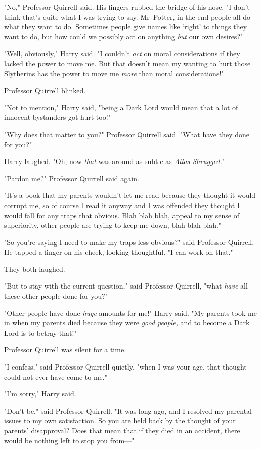 "No," Professor Quirrell said. His fingers rubbed the bridge of his nose. "I
don't think that's quite what I was trying to say. Mr~Potter, in the end
people all do what they want to do. Sometimes people give names like `right' to
things they want to do, but how could we possibly act on anything \emph{but}
our own desires?"

"Well, obviously," Harry said. "I couldn't \emph{act} on moral considerations
if they lacked the power to move me. But that doesn't mean my wanting to hurt
those Slytherins has the power to move me \emph{more} than moral
considerations!"

Professor Quirrell blinked.

"Not to mention," Harry said, "being a Dark Lord would mean that a lot of
innocent bystanders got hurt too!"

"Why does that matter to you?" Professor Quirrell said. "What have they done
for you?"

Harry laughed. "Oh, now \emph{that} was around as subtle as \emph{Atlas
Shrugged.}"

"Pardon me?" Professor Quirrell said again.

"It's a book that my parents wouldn't let me read because they thought it would
corrupt me, so of course I read it anyway and I was offended they thought I
would fall for any traps that obvious. Blah blah blah, appeal to my sense of
superiority, other people are trying to keep me down, blah blah blah."

"So you're saying I need to make my traps less obvious?" said Professor
Quirrell. He tapped a finger on his cheek, looking thoughtful. "I can work on
that."

They both laughed.

"But to stay with the current question," said Professor Quirrell, "what
\emph{have} all these other people done for you?"

"Other people have done \emph{huge} amounts for me!" Harry said. "My parents
took me in when my parents died because they were \emph{good people,} and to
become a Dark Lord is to betray that!"

Professor Quirrell was silent for a time.

"I confess," said Professor Quirrell quietly, "when I was your age, that
thought could not ever have come to me."

"I'm sorry," Harry said.

"Don't be," said Professor Quirrell. "It was long ago, and I resolved my
parental issues to my own satisfaction. So you are held back by the thought of
your parents' disapproval? Does that mean that if they died in an accident,
there would be nothing left to stop you from---"

